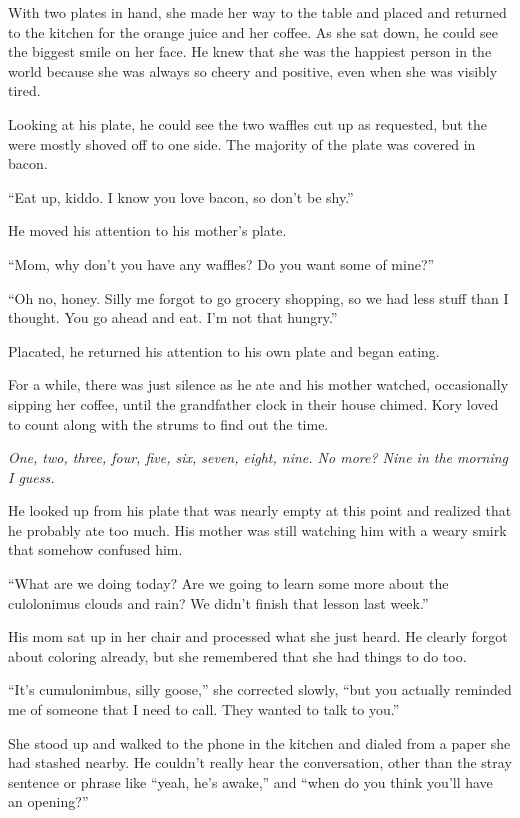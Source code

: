 \documentclass[9pt]{memoir}
\begin{document}
With two plates in hand, she made her way to the table and placed and returned to the kitchen for the orange juice and her coffee. As she sat down, he could see the biggest smile on her face. He knew that she was the happiest person in the world because she was always so cheery and positive, even when she was visibly tired.

Looking at his plate, he could see the two waffles cut up as requested, but the were mostly shoved off to one side. The majority of the plate was covered in bacon.

``Eat up, kiddo. I know you love bacon, so don't be shy.''

He moved his attention to his mother's plate.

``Mom, why don't you have any waffles? Do you want some of mine?''

``Oh no, honey. Silly me forgot to go grocery shopping, so we had less stuff than I thought. You go ahead and eat. I'm not that hungry.''

Placated, he returned his attention to his own plate and began eating.

For a while, there was just silence as he ate and his mother watched, occasionally sipping her coffee, until the grandfather clock in their house chimed. Kory loved to count along with the strums to find out the time.

\textit{One, two, three, four, five, six, seven, eight, nine. No more? Nine in the morning I guess.}

He looked up from his plate that was nearly empty at this point and realized that he probably ate too much. His mother was still watching him with a weary smirk that somehow confused him.

``What are we doing today? Are we going to learn some more about the culolonimus clouds and rain? We didn't finish that lesson last week.''

His mom sat up in her chair and processed what she just heard. He clearly forgot about coloring already, but she remembered that she had things to do too.

``It's cumulonimbus, silly goose,'' she corrected slowly, ``but you actually reminded me of someone that I need to call. They wanted to talk to you.''

She stood up and walked to the phone in the kitchen and dialed from a paper she had stashed nearby. He couldn't really hear the conversation, other than the stray sentence or phrase like ``yeah, he's awake,'' and ``when do you think you'll have an opening?''
\end{document}
